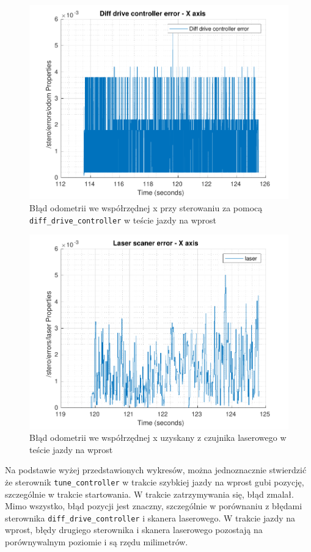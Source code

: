 \documentclass{mwrep}
\begin{document}
\begin{figure}[H]
	\centering
	\includegraphics[scale=0.8]{./figures/pro1/line_diff/line_diff_x.pdf}
	\caption{Błąd odometrii we współrzędnej x przy sterowaniu za pomocą \texttt{diff\_{}drive\_{}controller} w teście jazdy na wprost}
\end{figure}

\begin{figure}[H]
	\centering
	\includegraphics[scale=0.8]{./figures/pro1/line_tune/line_tune_laser_x.pdf}
	\caption{Błąd odometrii we współrzędnej x uzyskany z czujnika laserowego w teście jazdy na wprost}
\end{figure}

Na podstawie wyżej przedstawionych wykresów, można jednoznacznie stwierdzić że sterownik \texttt{tune\_{}controller} 
w trakcie szybkiej jazdy na wprost gubi pozycję, szczególnie w trakcie startowania. W trakcie zatrzymywania się, 
błąd zmalał. Mimo wszystko, błąd pozycji jest znaczny, szczególnie w porównaniu z błędami sterownika
\texttt{diff\_{}drive\_{}controller} i skanera laserowego. W trakcie jazdy na wprost, błędy drugiego sterownika i 
skanera laserowego pozostają na porównywalnym poziomie i są rzędu milimetrów. 
\end{document}
